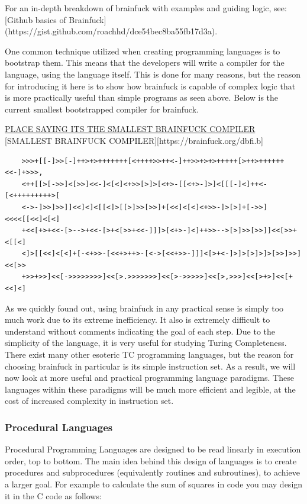 For an in-depth breakdown of brainfuck with examples and guiding logic, see: [Github basics of Brainfuck](https://gist.github.com/roachhd/dce54bec8ba55fb17d3a).

One common technique utilized when creating programming languages is to bootstrap them.
This means that the developers will write a compiler for the language, using the language itself.
This is done for many reasons, but the reason for introducing it here is to show how brainfuck is capable of complex logic that is more practically useful than simple programs as seen above.
Below is the current smallest bootstrapped compiler for brainfuck.

\href{https://esolangs.org/wiki/Brainfuck#Self-interpreters}{PLACE SAYING ITS THE SMALLEST BRAINFUCK COMPILER}
[SMALLEST BRAINFUCK COMPILER][https://brainfuck.org/dbfi.b]

\begin{verbatim}
    >>>+[[-]>>[-]++>+>+++++++[<++++>>++<-]++>>+>+>+++++[>++>++++++<<-]+>>>,
    <++[[>[->>]<[>>]<<-]<[<]<+>>[>]>[<+>-[[<+>-]>]<[[[-]<]++<-[<+++++++++>[
    <->-]>>]>>]]<<]<]<[[<]>[[>]>>[>>]+[<<]<[<]<+>>-]>[>]+[->>]<<<<[[<<]<[<]
    +<<[+>+<<-[>-->+<<-[>+<[>>+<<-]]]>[<+>-]<]++>>-->[>]>>[>>]]<<[>>+<[[<]
    <]>[[<<]<[<]+[-<+>>-[<<+>++>-[<->[<<+>>-]]]<[>+<-]>]>[>]>]>[>>]>>]<<[>>
    +>>+>>]<<[->>>>>>>>]<<[>.>>>>>>>]<<[>->>>>>]<<[>,>>>]<<[>+>]<<[+<<]<]
\end{verbatim}

As we quickly found out, using brainfuck in any practical sense is simply too much work due to its extreme inefficiency.
It also is extremely difficult to understand without comments indicating the goal of each step.
Due to the simplicity of the language, it is very useful for studying Turing Completeness.
There exist many other esoteric TC programming languages, but the reason for choosing brainfuck in particular is its simple instruction set.
As a result, we will now look at more useful and practical programming language paradigms.
These languages within these paradigms will be much more efficient and legible, at the cost of increased complexity in instruction set.

\subsubsection{Procedural Languages}\label{subsubsec:ProceduralPL}

Procedural Programming Languages are designed to be read linearly in execution order, top to bottom.
The main idea behind this design of languages is to create procedures and subprocedures (equivalently routines and subroutines), to achieve a larger goal.
For example to calculate the sum of squares in code you may design it in the C code as follows:

